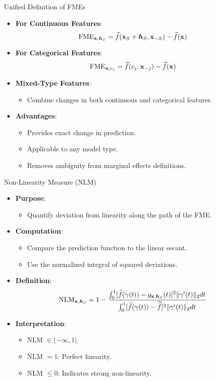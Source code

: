 \documentclass[10pt,compress,t,notes=noshow, xcolor=table]{beamer}
\newcommand{\boldhS}{\bm{h}_{S}}
\begin{document}
\begin{frame}{Unified Definition of FMEs}
\begin{itemize}
\item \textbf{For Continuous Features}:
\[
\text{FME}_{\xv, \boldhS} = \widehat{f}(\xv_S + \boldhS, \xv_{-S}) - \widehat{f}(\xv)
\]
\item \textbf{For Categorical Features}:
\[
\text{FME}_{\mathbf{x}, c_j} = \widehat{f}(c_j, \mathbf{x}_{-j}) - \widehat{f}(\mathbf{x})
\]
\item \textbf{Mixed-Type Features}:
\begin{itemize}
\item Combine changes in both continuous and categorical features.
\end{itemize}
\item \textbf{Advantages}:
\begin{itemize}
\item Provides exact change in prediction.
\item Applicable to any model type.
\item Removes ambiguity from marginal effects definitions.
\end{itemize}
\end{itemize}
\end{frame}


\begin{frame}{Non-Linearity Measure (NLM)}
\begin{itemize}
\item \textbf{Purpose}:
\begin{itemize}
  \item Quantify deviation from linearity along the path of the FME.
\end{itemize}
\item \textbf{Computation}:
\begin{itemize}
  \item Compare the prediction function to the linear secant.
  \item Use the normalized integral of squared deviations.
\end{itemize}
\item \textbf{Definition}:
\[
\text{NLM}_{\xv, \boldhS} = 1 - \frac{\int_0^1 [\widehat{f}(\gamma(t)) - g_{\xv, \boldhS}(t)]^2 \Vert \gamma'(t) \Vert_2 dt}{\int_0^1 [\widehat{f}(\gamma(t)) - \overline{\widehat{f}}]^2 \Vert \gamma'(t) \Vert_2 dt}
\]
\item \textbf{Interpretation}:
\begin{itemize}
  \item NLM $\in (-\infty, 1]$.
  \item NLM $=1$: Perfect linearity.
  \item NLM $\leq 0$: Indicates strong non-linearity.
\end{itemize}
\end{itemize}
\end{frame}
\end{document}
